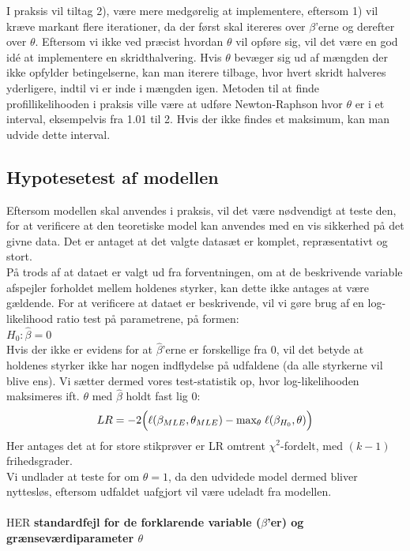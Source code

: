 \documentclass[11pt,a4paper]{article}
\begin{document}
I praksis vil tiltag 2), være mere medgørelig at implementere, eftersom 1) vil kræve markant flere iterationer, da der først skal itereres over $\beta$'erne og derefter over $\theta$. Eftersom vi ikke ved præcist hvordan $\theta$ vil opføre sig, vil det være en god idé at implementere en skridthalvering. Hvis $\theta$ bevæger sig ud af mængden der ikke opfylder betingelserne, kan man iterere tilbage, hvor hvert skridt halveres yderligere, indtil vi er inde i mængden igen. Metoden til at finde profillikelihooden i praksis ville være at udføre Newton-Raphson hvor $\theta$ er i et interval, eksempelvis fra 1.01 til 2. Hvis der ikke findes et maksimum, kan man udvide dette interval.

\subsection{Hypotesetest af modellen}
Eftersom modellen skal anvendes i praksis, vil det være nødvendigt at teste den, for at verificere at den teoretiske model kan anvendes med en vis sikkerhed på det givne data. Det er antaget at det valgte datasæt er komplet, repræsentativt og stort. \\
På trods af at dataet er valgt ud fra forventningen, om at de beskrivende variable afspejler forholdet mellem holdenes styrker, kan dette ikke antages at være gældende. For at verificere at dataet er beskrivende, vil vi gøre brug af en log-likelihood ratio test på parametrene, på formen:\\
$H_0: \hat{\beta} = 0$\\
Hvis der ikke er evidens for at $\hat{\beta}$'erne er forskellige fra 0, vil det betyde at holdenes styrker ikke har nogen indflydelse på udfaldene (da alle styrkerne vil blive ens). Vi sætter dermed vores test-statistik op, hvor log-likelihooden maksimeres ift. $\theta$ med $\hat{\beta}$ holdt fast lig 0:\\
\begin{align*}
LR = -2\Big{(}\ell (\beta_{MLE},\theta_{MLE})-\text{max}_\theta \;\ell (\beta_{H_0},\theta)\Big{)}
\end{align*}
Her antages det at for store stikprøver er LR omtrent $\chi^2$-fordelt, med $(k-1)$ frihedsgrader. \\
Vi undlader at teste for om $\theta=1$, da den udvidede model dermed bliver nyttesløs, eftersom udfaldet uafgjort vil være udeladt fra modellen. \\\\
HER
\textbf{standardfejl for de forklarende variable ($\beta$'er) og grænseværdiparameter $\theta$}
\end{document}
